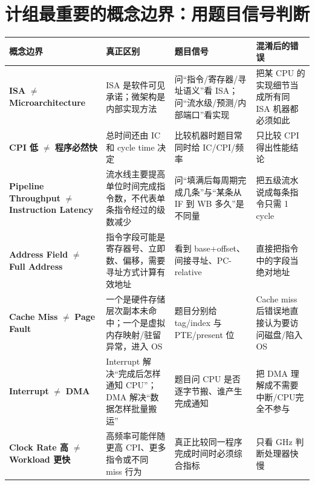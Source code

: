 \documentclass[11pt,a4paper,openany]{ctexbook}
\newcommand{\key}[1]{\textbf{\color{deep}#1}}
\begin{document}
\section{计组最重要的概念边界：用题目信号判断}
\begin{longtable}{L{3.6cm}L{4.3cm}L{4.0cm}L{\dimexpr\linewidth-13.17cm\relax}}
\toprule
\textbf{概念边界} & \textbf{真正区别} & \textbf{题目信号} & \textbf{混淆后的错误}\\
\midrule
\key{ISA} $\neq$ \key{Microarchitecture} & ISA 是软件可见承诺；微架构是内部实现方法 & 问“指令/寄存器/寻址语义”看 ISA；问“流水级/预测/内部端口”看实现 & 把某 CPU 的实现细节当成所有同 ISA 机器都必须如此 \\
\midrule
\key{CPI 低} $\neq$ \key{程序必然快} & 总时间还由 IC 和 cycle time 决定 & 比较机器时题目常同时给 IC/CPI/频率 & 只比较 CPI 得出性能结论 \\
\midrule
\key{Pipeline Throughput} $\neq$ \key{Instruction Latency} & 流水线主要提高单位时间完成指令数，不代表单条指令经过的级数减少 & 问“填满后每周期完成几条”与“某条从 IF 到 WB 多久”是不同量 & 把五级流水说成每条指令只需 1 cycle \\
\midrule
\key{Address Field} $\neq$ \key{Full Address} & 指令字段可能是寄存器号、立即数、偏移，需要寻址方式计算有效地址 & 看到 base+offset、间接寻址、PC-relative & 直接把指令中的字段当绝对地址 \\
\midrule
\key{Cache Miss} $\neq$ \key{Page Fault} & 一个是硬件存储层次副本未命中；一个是虚拟内存映射/驻留异常，进入 OS & 题目分别给 tag/index 与 PTE/present 位 & Cache miss 后错误地直接认为要访问磁盘/陷入 OS \\
\midrule
\key{Interrupt} $\neq$ \key{DMA} & Interrupt 解决“完成后怎样通知 CPU”；DMA 解决“数据怎样批量搬运” & 题目问 CPU 是否逐字节搬、谁产生完成通知 & 把 DMA 理解成不需要中断/CPU完全不参与 \\
\midrule
\key{Clock Rate 高} $\neq$ \key{Workload 更快} & 高频率可能伴随更高 CPI、更多指令或不同 miss 行为 & 真正比较同一程序完成时间时必须综合指标 & 只看 GHz 判断处理器快慢 \\
\bottomrule
\end{longtable}
\end{document}
